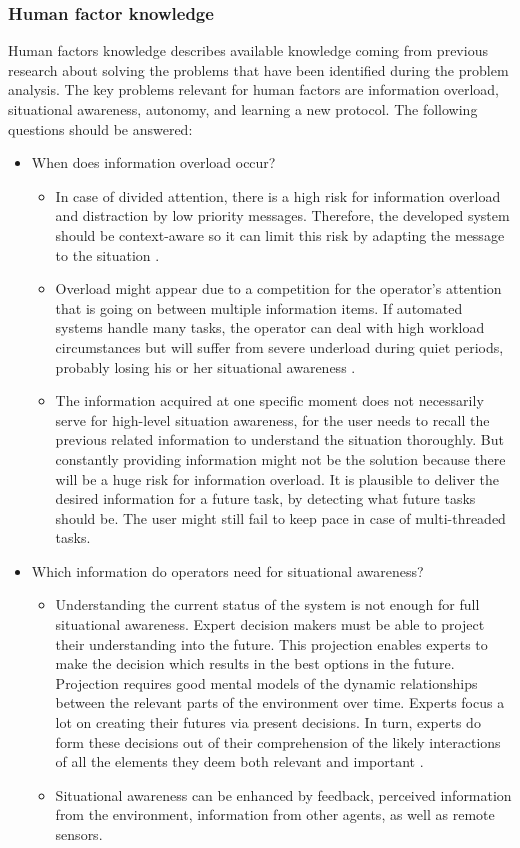 \subsubsection{Human factor knowledge}
Human factors knowledge describes available knowledge coming from previous research about solving the problems that have been identified during the problem analysis. The key problems relevant for human factors are information overload, situational awareness, autonomy, and learning a new protocol. The following questions should be answered:
\begin{itemize}
	\item When does information overload occur?
	\begin{itemize}
		\item In case of divided attention, there is a high risk for information overload and distraction by low priority messages. Therefore, the developed system should be context-aware so it can limit this risk by adapting the message to the situation \cite{Arimura2001}.
		\item Overload might appear due to a competition for the operator’s attention that is going on between multiple information items. If automated systems handle many tasks, the operator can deal with high workload circumstances but will suffer from severe underload during quiet periods, probably losing his or her situational awareness \cite{Neerincx2008}.
		\item The information acquired at one specific moment does not necessarily serve for high-level situation awareness, for the user needs to recall the previous related information to understand the situation thoroughly. But constantly providing information might not be the solution because there will be a huge risk for information overload. It is plausible to deliver the desired information for a future task, by detecting what future tasks should be. The user might still fail to keep pace in case of multi-threaded tasks\cite{Porathe2014}.
	\end{itemize}
	
	\item Which information do operators need for situational awareness?
	\begin{itemize}
		\item Understanding the current status of the system is not enough for full situational awareness. Expert decision makers must be able to project their understanding into the future. This projection enables experts to make the decision which results in the best options in the future. Projection requires good mental models of the dynamic relationships between the relevant parts of the environment over time. Experts focus a lot on creating their futures via present decisions. In turn, experts do form these decisions out of their comprehension of the likely interactions of all the elements they deem both relevant and important \cite{Gregory2010}.
		\item Situational awareness can be enhanced by feedback, perceived information from the environment, information from other agents, as well as remote sensors. \cite{Carver2007}
	\end{itemize}
	

\end{itemize}
